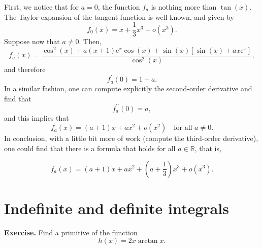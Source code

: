 \documentclass[a4paper,10 pt]{report}
\newcommand{\finalanswer}[1]{%
    \begin{finalAnswer}
    \[
        #1
    \]
    \end{finalAnswer}
}
\theoremstyle{definition}
\newcommand{\R}{\mathbb R}
\begin{document}
\begin{solutionBox} First, we notice that for $a = 0$, the function $f_a$ is nothing more than $\tan (x)$. The Taylor expansion of the tangent function is well-known, and given by
\begin{equation*}f_0(x) = x + \frac{1}{3}x^3 + o(x^3).\end{equation*}
Suppose now that $a \neq 0$. Then,
\begin{equation*}f_a^\prime(x) = \frac{\cos^2(x) + a (x + 1) \mathrm{e}^x \cos(x) + \sin(x)\left[\sin(x) + a x \mathrm{e}^x \right] }{\cos^2(x)},\end{equation*}
and therefore
\begin{equation*}f_a^\prime(0) = 1 + a.\end{equation*}
In a similar fashion, one can compute explicitly the second-order derivative and find that
\begin{equation*}f_a^{\prime\prime}(0) = a,\end{equation*}
and this implies that
\begin{equation*}f_a(x) = (a + 1)x + ax^2 + o(x^2) \quad \text{for all $a \neq 0$}.\end{equation*}
In conclusion, with a little bit more of work (compute the third-order derivative), one could find that there is a formula that holds for all $a \in \R$, that is,
\finalanswer{
f_a(x) = (a + 1)x + ax^2 + \left(a + \frac{1}{3} \right)x^3 + o(x^3).
} 
\end{solutionBox}

\chapter{Indefinite and definite integrals}

\begin{exerciseBox} \textbf{Exercise.} \label{ex51} Find a primitive of the function
\begin{equation*} h(x) = 2x \arctan x. \end{equation*}
\end{exerciseBox}
\end{document}
